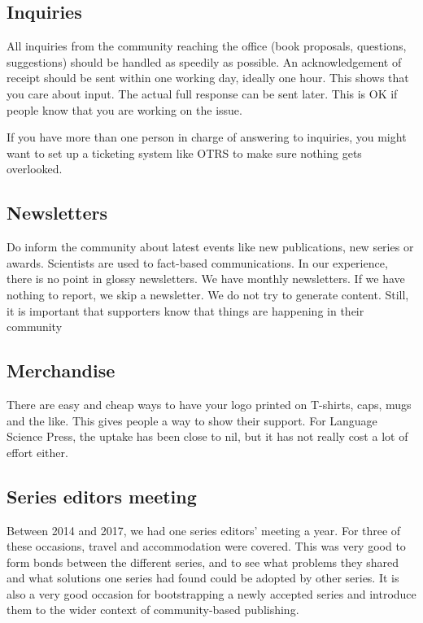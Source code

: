 \documentclass[guidelines,nonflat,modfonts] {langsci/langscibook}
\begin{document}
\subsection{Inquiries}
All inquiries from the community reaching the office (book proposals, questions, suggestions) should be handled as speedily as possible. An acknowledgement of receipt should be sent within one working day, ideally one hour. This shows that you care about input. The actual full response can be sent later. This is OK if people know that you are working on the issue. 

If you have more than one person in charge of answering to inquiries, you might want to set up a ticketing system like OTRS to make sure nothing gets overlooked. 

\subsection{Newsletters}
Do inform the community about latest events like new publications, new series or awards. Scientists are used to fact-based communications. In our experience, there is no point in glossy newsletters. We have monthly newsletters. If we have nothing to report, we skip a newsletter. We do not try to generate content. Still, it is important that supporters know that things are happening in their community %


\subsection{Merchandise}
There are easy and cheap ways to have your logo printed on T-shirts, caps, mugs and the like. This gives people a way to show their support. For Language Science Press, the uptake has been close to nil, but it has not really cost a lot of effort either. 

\subsection{Series editors meeting}  
Between 2014 and 2017, we had one series editors' meeting a year. For three of these occasions, travel and accommodation were covered. This was very good to form bonds between the different series, and to see what problems they shared and what solutions one series had found could be adopted by other series. It is also a very good occasion for bootstrapping a newly accepted series and introduce them to the wider context of community-based publishing. 
\end{document}
